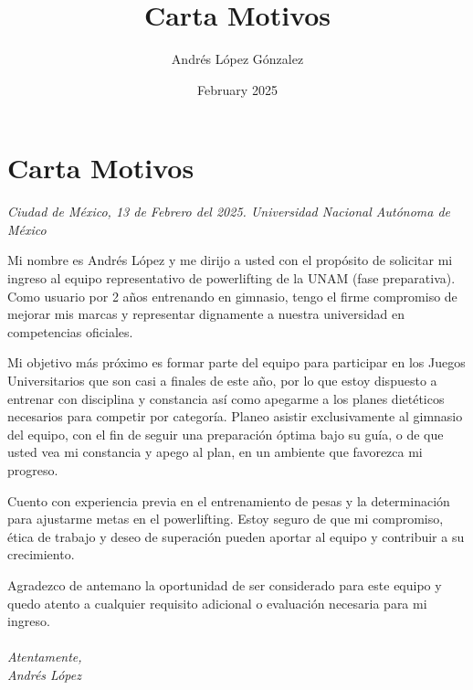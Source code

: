 \documentclass{article}
\title{Carta Motivos}
\author{Andrés López Gónzalez}
\date{February 2025}
\begin{document}
\section*{Carta Motivos}

\textit{Ciudad de México, 13 de Febrero del 2025. Universidad Nacional Autónoma de México}

Mi nombre es Andrés López y me dirijo a usted con el propósito de solicitar mi ingreso al equipo representativo de powerlifting de la UNAM (fase preparativa). Como usuario por 2 años entrenando en gimnasio, tengo el firme compromiso de mejorar mis marcas y representar dignamente a nuestra universidad en competencias oficiales.

Mi objetivo más próximo es formar parte del equipo para participar en los Juegos Universitarios que son casi a finales de este año, por lo que estoy dispuesto a entrenar con disciplina y constancia así como apegarme a los planes dietéticos necesarios para competir por categoría. Planeo asistir exclusivamente al gimnasio del equipo, con el fin de seguir una preparación óptima bajo su guía, o de que usted vea mi constancia y apego al plan, en un ambiente que favorezca mi progreso.

Cuento con experiencia previa en el entrenamiento de pesas y la determinación para ajustarme metas en el powerlifting. Estoy seguro de que mi compromiso, ética de trabajo y deseo de superación pueden aportar al equipo y contribuir a su crecimiento.

Agradezco de antemano la oportunidad de ser considerado para este equipo y quedo atento a cualquier requisito adicional o evaluación necesaria para mi ingreso.
\\\\
\textit{Atentamente,\\
Andrés López}
\end{document}
